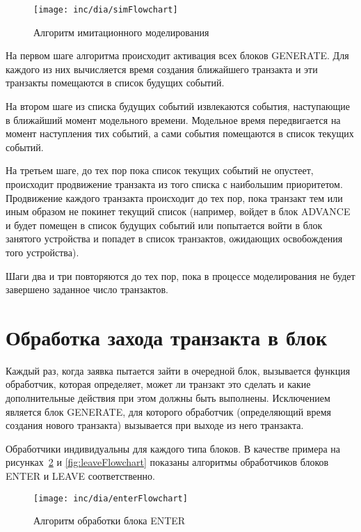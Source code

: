 \begin{figure}[ht!]
  \centering
  \texttt{[image: inc/dia/simFlowchart]}
  \caption{Алгоритм имитационного моделирования}
  \label{fig:simFlowchart}
\end{figure}

На первом шаге алгоритма происходит активация всех блоков GENERATE. Для каждого из них вычисляется время создания ближайшего транзакта и эти транзакты помещаются в список будущих событий.

На втором шаге из списка будущих событий извлекаются события, наступающие в ближайший момент модельного времени. Модельное время передвигается на момент наступления тих событий, а сами события помещаются в  список текущих событий. 

На третьем шаге, до тех пор пока список текущих событий не опустеет, происходит продвижение транзакта из того списка с наибольшим приоритетом. Продвижение каждого транзакта происходит до тех пор, пока транзакт тем или иным образом не покинет текущий список (например, войдет в блок ADVANCE и будет помещен в список будущих событий или попытается войти в блок занятого устройства и попадет в список транзактов, ожидающих освобождения того устройства).

Шаги два и три повторяются до тех пор, пока в процессе моделирования не будет завершено заданное число транзактов.




\section{Обработка захода транзакта в блок}

Каждый раз, когда заявка пытается зайти в очередной блок, вызывается функция обработчик, которая определяет, может ли транзакт это сделать и какие дополнительные действия при этом должны быть выполнены. Исключением является блок GENERATE, для которого обработчик (определяющий время создания нового транзакта) вызывается при выходе из него транзакта. 

Обработчики индивидуальны для каждого типа блоков. В качестве примера на рисунках~\ref{fig:enterFlowchart} и \ref{fig:leaveFlowchart} показаны алгоритмы обработчиков блоков ENTER и LEAVE соответственно.

\begin{figure}[ht!]
  \centering
  \texttt{[image: inc/dia/enterFlowchart]}
  \caption{Алгоритм обработки блока ENTER}
  \label{fig:enterFlowchart}
\end{figure}

